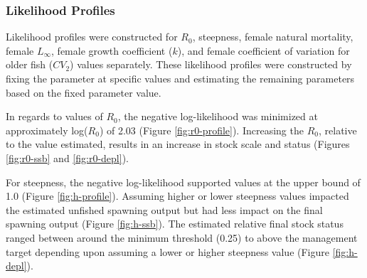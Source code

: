 \documentclass[11pt,
  english,
  a4paper,
]{article}
\begin{document}

\hypertarget{likelihood-profiles}{%
\subsubsection{Likelihood Profiles}\label{likelihood-profiles}}

\leavevmode\tagmcend\tagstructend


Likelihood profiles were constructed for {\(R_0\)\leavevmode\tagmcend\tagstructend}, steepness, female natural mortality, female {\(L_{\infty}\)\leavevmode\tagmcend\tagstructend}, female growth coefficient ({\(k\)\leavevmode\tagmcend\tagstructend}), and female coefficient of variation for older fish ({\(CV_2\)\leavevmode\tagmcend\tagstructend}) values separately. These likelihood profiles were constructed by fixing the parameter at specific values and estimating the remaining parameters based on the fixed parameter value.

\leavevmode\tagmcend\tagstructend\par


In regards to values of {\(R_0\)\leavevmode\tagmcend\tagstructend}, the negative log-likelihood was minimized at approximately log({\(R_0\)\leavevmode\tagmcend\tagstructend}) of 2.03 (Figure \ref{fig:r0-profile}). Increasing the {\(R_0\)\leavevmode\tagmcend\tagstructend}, relative to the value estimated, results in an increase in stock scale and status (Figures \ref{fig:r0-ssb} and \ref{fig:r0-depl}).

\leavevmode\tagmcend\tagstructend\par


For steepness, the negative log-likelihood supported values at the upper bound of 1.0 (Figure \ref{fig:h-profile}). Assuming higher or lower steepness values impacted the estimated unfished spawning output but had less impact on the final spawning output (Figure \ref{fig:h-ssb}). The estimated relative final stock status ranged between around the minimum threshold (0.25) to above the management target depending upon assuming a lower or higher steepness value (Figure \ref{fig:h-depl}).
\end{document}
